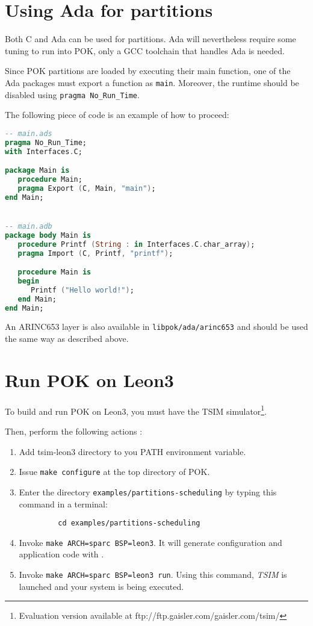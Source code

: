 \clearpage

   \section{Using Ada for partitions}
   Both C and Ada can be used for partitions. Ada will nevertheless require
   some tuning to run into POK, only a GCC toolchain that handles Ada is
   needed.

   Since POK partitions are loaded by executing their main function, one of
   the Ada packages must export a function as \texttt{main}. Moreover, the
   runtime should be disabled using \texttt{pragma No\_Run\_Time}.

   The following piece of code is an example of how to proceed:

   \begin{lstlisting}[language=Ada]
-- main.ads
pragma No_Run_Time;
with Interfaces.C;

package Main is
   procedure Main;
   pragma Export (C, Main, "main");
end Main;


-- main.adb
package body Main is
   procedure Printf (String : in Interfaces.C.char_array);
   pragma Import (C, Printf, "printf");

   procedure Main is
   begin
      Printf ("Hello world!");
   end Main;
end Main;
   \end{lstlisting}

   An ARINC653 layer is also available in \texttt{libpok/ada/arinc653} and
   should be used the same way as described above.

\clearpage

   \section{Run POK on Leon3}
   To build and run POK on Leon3, you must have the TSIM simulator\footnote{Evaluation version available at ftp://ftp.gaisler.com/gaisler.com/tsim/}.

   Then, perform the following actions :
   \begin{enumerate}
      \item
        Add tsim-leon3 directory to you PATH environment variable.
      \item
         Issue \texttt{make configure} at the top directory of POK.
      \item
         Enter the directory \texttt{examples/partitions-scheduling} by typing
         this command in a terminal:
         \begin{verbatim}
         cd examples/partitions-scheduling
         \end{verbatim}
      \item
         Invoke \texttt{make ARCH=sparc BSP=leon3}. It will generate configuration and application
         code with \ocarina.
      \item
         Invoke \texttt{make ARCH=sparc BSP=leon3 run}.
         Using this command, \textit{TSIM} is launched and your system is being
         executed.
   \end{enumerate}

